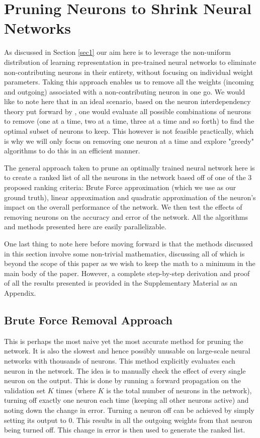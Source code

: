 \section{Pruning Neurons to Shrink Neural Networks}\label{sec2}
As discussed in Section \ref{sec1} our aim here is to leverage the non-uniform distribution of learning representation in pre-trained neural networks to eliminate non-contributing neurons in their entirety, without focusing on individual weight parameters. Taking this approach enables us to remove all the weights (incoming and outgoing) associated with a non-contributing neuron in one go. We would like to note here that in an ideal scenario, based on the neuron interdependency theory put forward by \cite{mozer1989skeletonization}, one would evaluate all possible combinations of neurons to remove (one at a time, two at a time, three at a time and so forth) to find the optimal subset of neurons to keep. This however is not feasible practically, which is why we will only focus on removing one neuron at a time and explore "greedy" algorithms to do this in an efficient manner.

The general approach taken to prune an optimally trained neural network here is to create a ranked list of all the neurons in the network based off of one of the 3 proposed ranking criteria: Brute Force approximation (which we use as our ground truth), linear approximation and quadratic approximation of the neuron's impact on the overall performance of the network. We then test the effects of removing neurons on the accuracy and error of the network. All the algorithms and methods presented here are easily parallelizable. 

One last thing to note here before moving forward is that the methods discussed in this section involve some non-trivial mathematics, discussing all of which is beyond the scope of this paper as we wish to keep the math to a minimum in the main body of the paper. However, a complete step-by-step derivation and proof of all the results presented is provided in the Supplementary Material as an Appendix.

\subsection{Brute Force Removal Approach}
This is perhaps the most naive yet the most accurate method for pruning the network. It is also the slowest and hence possibly unusable on large-scale neural networks with thousands of neurons. This method explicitly evaluates each neuron in the network. The idea is to manually check the effect of every single neuron on the output. This is done by running a forward propagation on the validation set $K$ times (where $K$ is the total number of neurons in the network), turning off exactly one neuron each time (keeping all other neurons active) and noting down the change in error. Turning a neuron off can be achieved by simply setting its output to 0. This results in all the outgoing weights from that neuron being turned off. This change in error is then used to generate the ranked list. 


%
%

